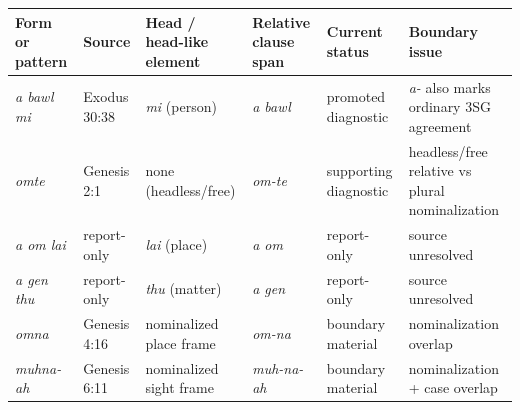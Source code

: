 \documentclass[
  11pt,
  a4paper,
]{article}
\newcounter{none} %
\newcommand{\tdim}[1]{\textit{#1}}
\begin{document}
{\def\LTcaptype{none} %
\begin{longtable}[]{@{}
  >{\raggedright\arraybackslash}p{}
  >{\raggedright\arraybackslash}p{}
  >{\raggedright\arraybackslash}p{}
  >{\raggedright\arraybackslash}p{}
  >{\raggedright\arraybackslash}p{}
  >{\raggedright\arraybackslash}p{}@{}}
\toprule\noalign{}
\begin{minipage}[b]{\linewidth}\raggedright
Form or pattern
\end{minipage} & \begin{minipage}[b]{\linewidth}\raggedright
Source
\end{minipage} & \begin{minipage}[b]{\linewidth}\raggedright
Head / head-like element
\end{minipage} & \begin{minipage}[b]{\linewidth}\raggedright
Relative clause span
\end{minipage} & \begin{minipage}[b]{\linewidth}\raggedright
Current status
\end{minipage} & \begin{minipage}[b]{\linewidth}\raggedright
Boundary issue
\end{minipage} \\
\midrule\noalign{}
\endhead
\bottomrule\noalign{}
\endlastfoot
\tdim{a bawl mi} & Exodus 30:38 & \tdim{mi} (person) & \tdim{a bawl} &
promoted diagnostic & \tdim{a-} also marks ordinary 3SG agreement \\
\tdim{omte} & Genesis 2:1 & none (headless/free) & \tdim{om-te} &
supporting diagnostic & headless/free relative vs plural
nominalization \\
\tdim{a om lai} & report-only & \tdim{lai} (place) & \tdim{a om} &
report-only & source unresolved \\
\tdim{a gen thu} & report-only & \tdim{thu} (matter) & \tdim{a gen} &
report-only & source unresolved \\
\tdim{omna} & Genesis 4:16 & nominalized place frame & \tdim{om-na} &
boundary material & nominalization overlap \\
\tdim{muhna-ah} & Genesis 6:11 & nominalized sight frame &
\tdim{muh-na-ah} & boundary material & nominalization + case overlap \\

\end{longtable}}
\end{document}
